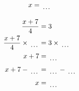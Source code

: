 \documentclass[12pt]{article}
\newcounter{minipagecount}
\begin{document}
\begin{multicols}{2}
\begin{minipage}[t]{0.45\textwidth}
\begin{align*}
        x &= \dotuline{\hspace{5mm}}\\
    \end{align*}
\end{minipage} %
\noindent{(\theminipagecount)}\hspace{0.1mm} %
\begin{minipage}[t]{0.45\textwidth} %
    \vspace{-26pt}  %
    \raggedright %
    \begin{align*} %
        \frac{x + 7}{4} &= 3\\
        \frac{x + 7}{4} \times\dotuline{\hspace{5mm}} &= 3 \times\dotuline{\hspace{5mm}}\\
        x + 7 &= \dotuline{\hspace{5mm}}\\
        x + 7 - \dotuline{\hspace{5mm}} &= \dotuline{\hspace{5mm}} - \dotuline{\hspace{5mm}}\\
        x &= \dotuline{\hspace{5mm}}\\
    \end{align*}
\end{minipage} %
\noindent{(\theminipagecount)}\hspace{0.1mm} %
\begin{minipage}[t]{0.45\textwidth} %
    \vspace{-26pt}  %

\end{minipage}
\end{multicols}
\end{document}
